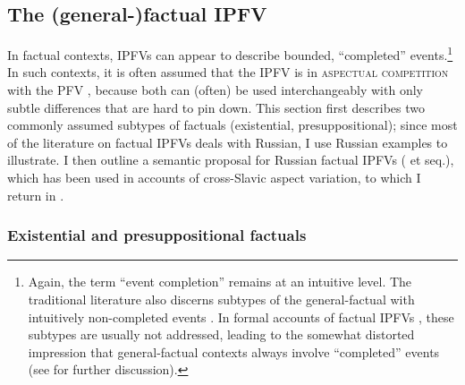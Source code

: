 \documentclass[output=paper,colorlinks,citecolor=brown]{langscibook}
\begin{document}
\subsection{The (general-)factual IPFV}
\label{sec:OF}

In factual contexts, IPFVs can appear to describe bounded, ``completed'' events.\footnote{Again, the term ``event completion'' remains at an intuitive level. The traditional literature also discerns subtypes of the general-factual with intuitively non-completed events \citep[e.g.][]{glovinskaja81,glovinskaja89,paduceva96}. In formal accounts of factual IPFVs \citep[e.g.][]{gronndiss}, these subtypes are usually not addressed, leading to the somewhat distorted impression that general-factual contexts always involve ``completed'' events (see \citealt{gehrketrueipf} for further discussion).} In such contexts, it is often assumed that the IPFV is in \textsc{aspectual competition} with the PFV \citep[a term that goes back to at least][]{mathesius38}, because both can (often) be used interchangeably with only subtle differences that are hard to pin down. This section first describes two commonly assumed subtypes of factuals (existential, presuppositional); since most of the literature on factual IPFVs deals with Russian, I use Russian examples to illustrate. I then outline a semantic proposal for Russian factual IPFVs (\citealt{gronndiss} et seq.), which has been used in accounts of cross-Slavic aspect variation, to which I return in . 

\subsubsection{Existential and presuppositional factuals}
\end{document}
